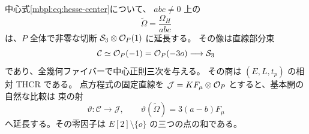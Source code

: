 \begin{lemma}
\label{mbhp:lem:regularized-center}
中心式\eqref{mbpl:eq:hesse-center}について、
$abc\ne0$ 上の
\begin{equation}\label{mbhp:eq:regularized-center}
 \widetilde\Omega=\frac{\Omega_H}{abc}
\end{equation}
は、$P$ 全体で非零な切断
$\mathcal S_3\otimes\mathcal O_P(1)$ に延長する。
その像は直線部分束
\[
 \mathcal C\simeq\mathcal O_P(-1)=\mathcal O_P(-3o)\longrightarrow\mathcal S_3
\]
であり、全幾何ファイバーで中心正則三次を与える。
その商は $(E,L,t_p)$ の相対 THCR である。
点方程式の固定直線を
$\mathcal J=KF_\mu\otimes\mathcal O_P$ とすると、基本開の自然な比較は
束の射
\begin{equation}\label{mbhp:eq:extended-theta}
 \vartheta:\mathcal C\longrightarrow\mathcal J,\qquad
 \vartheta(\widetilde\Omega)=3(a-b)F_\mu
\end{equation}
へ延長する。その零因子は
$E[2]\setminus\{o\}$ の三つの点の和である。
\end{lemma}
